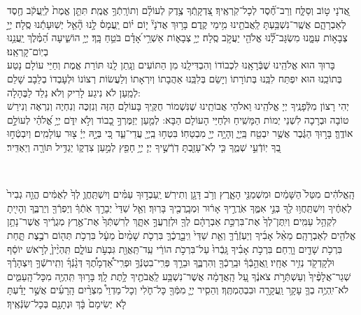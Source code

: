 \documentclass[twoside, openany, parskip=half, 11pt]{book}
\begin{document}
    אֲ֭דֹנָי ט֣וֹב וְסַלָּ֑ח וְרַב־חֶ֝֗סֶד לְכָל־קֹֽרְאֶֽיךָ׃ צִ֭דְקָֽתְֿךָ
     צֶ֥דֶק לְעוֹלָ֗ם וְתוֹרָֽתְֿךָ֥ אֱמֶֽת׃ תִּתֵּ֤ן
      אֱמֶת֙ לְיַֽעֲקֹ֔ב חֶ֖סֶד לְאַבְרָהָ֑ם אֲשֶֽׁר־נִשְׁבַּ֥עְתָּ לַֽאֲבֹתֵ֖ינוּ מִ֥ימֵי קֶֽדֶם׃ בָּר֥וּךְ
       אֲדֹנָי֘ י֤וֹם י֗וֹם יַֽעֲמָס֫ לָ֥נוּ הָ֘אֵ֤ל יְשֽׁוּעָתֵ֬נוּ סֶֽלָה׃ יְיָ֣ 
       צְבָא֣וֹת עִמָּ֑נוּ מִשְׂגָּב־לָ֝֗נוּ אֱלֹהֵ֖י יַעֲקֹ֣ב סֶֽלָה׃ יְיָ֥
       צְבָא֑וֹת אַשְׁרֵ֥י ֝אָדָ֗ם בֹּטֵ֥חַ בָּֽךְ׃ יְיָ֥ 
       הוֹשִׁ֑יעָה הַ֝מֶּ֗לֶךְ יַֽעֲנֵ֥נוּ בְיֽוֹם־קָרְאֵֽנוּ׃ \\
 בָּרוּךְ הוּא אֱלֹהֵֽינוּ שֶׁבְּֿרָאָֽנוּ לִכְבוֹדוֹ וְהִבְדִּילָֽנוּ מִן הַתּוֹעִים וְנָֽתַן לָֽנוּ תּוֹרַת אֱמֶת וְחַיֵּי עוֹלָם נָטַע בְּתוֹכֵֽנוּ הוּא יִפְתַּח לִבֵּֽנוּ בְּתוֹרָתוֹ וְיָשֵׂם בְּלִבֵּֽנוּ אַהֲבָתוֹ וְיִרְאָתוֹ וְלַעֲשׂוֹת רְצוֹנוֹ וּלְעָבְדוֹ בְלֵבָב שָׁלֵם לְמַֽעַן לֹא נִיגַע לָרִיק וְלֹא נֵלֵד לַבֶּהָלָה:\\
 יְהִי רָצוֹן מִלְּֿפָנֶֽיךָ יְיָ אֱלֹהֵֽינוּ וֵאלֹהֵי אֲבוֹתֵֽינוּ שֶׁנִּשְׁמוֹר חֻקֶּֽיךָ בָּעוֹלָם הַזֶּה וְנִזְכֶּה וְנִחְיֶה וְנִרְאֶה וְנִירַשׁ טוֹבָה וּבְרָכָה לִשְׁנֵי יְמוֹת הַמָּשִֽׁיחַ וּלְחַיֵּי הָעוֹלָם הַבָּא: לְמַ֤עַן
  יְזַמֶּרְךָ֣ כָ֭בוֹד וְלֹ֣א יִדֹּ֑ם יְיָ֥ אֱ֝לֹהַ֗י לְעוֹלָ֣ם אוֹדֶֽךָּ׃ בָּר֣וּךְ
   הַגֶּ֔בֶר אֲשֶׁ֥ר יִבְטַ֖ח בַּֽיְיָ֑ וְהָיָ֥ה יְיָ֖ מִבְטַחֽוֹ׃ בִּטְח֥וּ
    בַֽיְיָ֖ עֲדֵי־עַ֑ד כִּ֚י בְּיָ֣הּ יְיָ֔ צ֖וּר עֽוֹלָמִֽים׃  וְיִבְטְֿח֣וּ
     בְ֭ךָ יֽוֹדְֿעֵ֣י שְׁמֶ֑ךָ כִּ֤י לֹֽא־עָזַ֖בְתָּ דֹֽרְֿשֶׁ֣יךָ יְיָ׃ יְיָ֥
      חָפֵ֖ץ לְמַ֣עַן צִדְק֑וֹ יַגְדִּ֥יל תּוֹרָ֖ה וְיַאְדִּֽיר׃


 \pageref{sefiras haomer} \\
 \pageref{chanukah}

\label{veyiten lecha}

 
 הָֽאֱלֹהִ֔ים מִטַּל֙ הַשָּׁמַ֔יִם וּמִשְׁמַנֵּ֖י הָאָ֑רֶץ וְרֹ֥ב דָּגָ֖ן וְתִירֽשׁ׃ יַֽעַבְד֣וּךָ עַמִּ֗ים וְיִשְׁתַּֽחֲוֻ֤ לְךָ֙ לְאֻמִּ֔ים הֱוֵ֤ה גְבִיר֙ לְאַחֶ֔יךָ וְיִשְׁתַּֽחֲו֥וּ לְ֖ךָ בְּנֵ֣י אִמֶּ֑ךָ אֹֽרֲרֶ֣יךָ אָר֔וּר וּֽמְבָֽרֲכֶ֖יךָ בָּרֽוּךְ׃ 
וְאֵ֤ל שַׁדַּי֙ יְבָרֵ֣ךְ אֹֽתְֿךָ֔ וְיַפְרְֿךָ֖ וְיַרְבֶּ֑ךָ וְהָיִ֖יתָ לִקְהַ֥ל עַמִּֽים׃ וְיִֽתֶּן־לְךָ֙ אֶת־בִּרְכַּ֣ת אַבְרָהָ֔ם לְךָ֖ וּלְזַרְעֲךָ֣ אִתָּ֑ךְ לְרִשְׁתְּֿךָ֙ אֶת־אֶ֣רֶץ מְגֻרֶ֔יךָ אֲשֶׁר־נָתַ֥ן אֱלֹהִ֖ים לְאַבְרָהָֽם׃ 
 מֵאֵ֨ל אָבִ֜יךָ וְיַעְזְֿרֶ֗ךָּ וְאֵ֤ת שַׁדַּי֙ וִֽיבָ֣רֲכֶ֔ךָּ בִּרְכֹ֤ת שָׁמַ֨יִם֙ מֵעָ֔ל בִּרְכֹ֥ת תְּה֖וֹם רֹבֶ֣צֶת תָּ֑חַת בִּרְכֹ֥ת שָׁדַ֖יִם וָרָֽחַם׃ בִּרְכֹ֣ת אָבִ֗יךָ גָּֽבְֿרוּ֙ עַל־בִּרְכֹ֣ת הוֹרַ֔י עַֽד־תַּֽאֲוַ֖ת גִּבְעֹ֣ת עוֹלָ֑ם תִּֽהְיֶ֨יןָ֙ לְרֹ֣אשׁ יוֹסֵ֔ף וּלְקָדְקֹ֖ד נְזִ֥יר אֶחָֽיו׃ 
 וַֽאֲהֵ֣בְֿךָ֔ 
 וּבֵֽרַכְֿךָ֖ וְהִרְבֶּ֑ךָ וּבֵרַ֣ךְ פְּרִֽי־בִטְנְֿךָ֣ וּפְרִֽי־אַ֠דְמָתֶ֠ךָ דְּגָ֨נְֿךָ֜ וְתִֽירשְֿׁךָ֣ וְיִצְהָרֶ֗ךָ שְׁגַר־אֲלָפֶ֨יךָ֙ וְעַשְׁתְּֿרֹ֣ת צֹאנֶ֔ךָ עַ֚ל הָֽאֲדָמָ֔ה אֲשֶׁר־נִשְׁבַּ֥ע לַֽאֲבֹתֶ֖יךָ לָ֥תֶת לָֽךְ׃ בָּר֥וּךְ תִּֽהְיֶ֖ה מִכָּל־הָֽעַמִּ֑ים לֹא־יִֽהְיֶ֥ה בְךָ֛ עָקָ֥ר וַֽעֲקָרָ֖ה וּבִבְהֶמְתֶּֽךָ׃ וְהֵסִ֧יר יְיָ֛ מִמְּֿךָ֖ כָּל־חֹ֑לִי וְכָל־מַדְוֵי֩ מִצְרַ֨יִם הָֽרָעִ֜ים אֲשֶׁ֣ר יָדַ֗עְתָּ לֹ֤א יְשִׂימָם֙ בָּ֔ךְ וּנְתָנָ֖ם בְּכָל־שֽׂנְֿאֶֽיךָ׃
 
\end{document}
